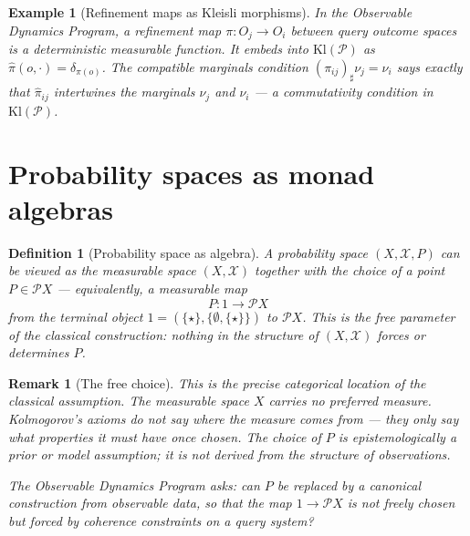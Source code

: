 \documentclass[11pt]{article}
\newtheorem{definition}{Definition}
\newtheorem{remark}{Remark}
\newtheorem{example}{Example}
\newcommand{\Kl}{\mathrm{Kl}}
\newcommand{\Pcal}{\mathcal{P}}
\newcommand{\Xcal}{\mathcal{X}}
\begin{document}
\begin{example}[Refinement maps as Kleisli morphisms]
In the Observable Dynamics Program, a refinement map $\pi : O_j \to O_i$
between query outcome spaces is a deterministic measurable function.  It
embeds into $\Kl(\Pcal)$ as $\hat{\pi}(o, \cdot) = \delta_{\pi(o)}$.
The compatible marginals condition $(\pi_{ij})_\sharp \nu_j = \nu_i$ says
exactly that $\hat{\pi}_{ij}$ intertwines the marginals $\nu_j$ and $\nu_i$
--- a commutativity condition in $\Kl(\Pcal)$.
\end{example}

\section{Probability spaces as monad algebras}\label{sec:algebras}

\begin{definition}[Probability space as algebra]
A \emph{probability space} $(X, \Xcal, P)$ can be viewed as the measurable
space $(X, \Xcal)$ together with the choice of a \emph{point}
$P \in \Pcal X$ --- equivalently, a measurable map
\[
  P : 1 \to \Pcal X
\]
from the terminal object $1 = (\{\star\}, \{\emptyset, \{\star\}\})$ to
$\Pcal X$.  This is the \emph{free parameter} of the classical construction:
nothing in the structure of $(X, \Xcal)$ forces or determines $P$.
\end{definition}

\begin{remark}[The free choice]
This is the precise categorical location of the classical assumption.  The
measurable space $X$ carries no preferred measure.  Kolmogorov's axioms do
not say where the measure comes from --- they only say what properties it
must have once chosen.  The choice of $P$ is epistemologically a \emph{prior}
or \emph{model assumption}; it is not derived from the structure of
observations.

The Observable Dynamics Program asks: can $P$ be replaced by a \emph{canonical}
construction from observable data, so that the map $1 \to \Pcal X$ is not
freely chosen but forced by coherence constraints on a query system?
\end{remark}
\end{document}
